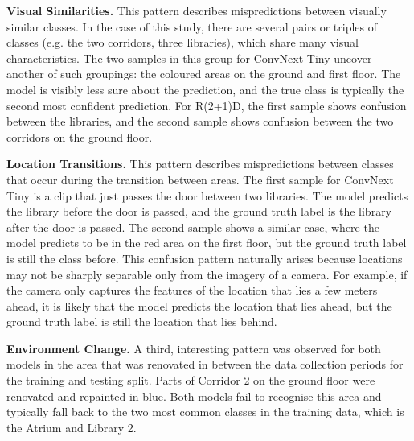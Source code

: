 \documentclass[a4paper]{article}
\begin{document}
\textbf{Visual Similarities.} This pattern describes mispredictions between
visually similar classes. In the case of this study, there are several pairs or
triples of classes (e.g. the two corridors, three libraries), which share many
visual characteristics. The two samples in this group for ConvNext Tiny
uncover another of such groupings: the coloured areas on the ground and first
floor. The model is visibly less sure about the prediction, and the true class
is typically the second most confident prediction. For R(2+1)D, the first sample
shows confusion between the libraries, and the second sample shows confusion
between the two corridors on the ground floor.

\textbf{Location Transitions.} This pattern describes mispredictions between
classes that occur during the transition between areas. The first sample for
ConvNext Tiny is a clip that just passes the door between two libraries. The
model predicts the library before the door is passed, and the ground truth label
is the library after the door is passed. The second sample shows a similar case,
where the model predicts to be in the red area on the first floor, but the
ground truth label is still the class before. This confusion pattern naturally
arises because locations may not be sharply separable only from the imagery of a
camera. For example, if the camera only captures the features of the location
that lies a few meters ahead, it is likely that the model predicts the location
that lies ahead, but the ground truth label is still the location that lies
behind.

\textbf{Environment Change.} A third, interesting pattern was observed for both
models in the area that was renovated in between the data collection
periods for the training and testing split. Parts of Corridor 2 on the ground
floor were renovated and repainted in blue. Both models fail to recognise this
area and typically fall back to the two most common classes in the training
data, which is the Atrium and Library 2.
\end{document}
